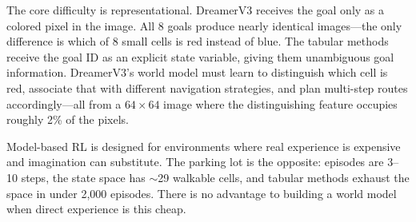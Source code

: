 \documentclass[letterpaper]{article}
\begin{document}
The core difficulty is representational. DreamerV3 receives the goal only as a colored pixel in the image. All 8 goals produce nearly identical images---the only difference is which of 8 small cells is red instead of blue. The tabular methods receive the goal ID as an explicit state variable, giving them unambiguous goal information. DreamerV3's world model must learn to distinguish which cell is red, associate that with different navigation strategies, and plan multi-step routes accordingly---all from a $64 \times 64$ image where the distinguishing feature occupies roughly 2\% of the pixels.

Model-based RL is designed for environments where real experience is expensive and imagination can substitute. The parking lot is the opposite: episodes are 3--10 steps, the state space has $\sim$29 walkable cells, and tabular methods exhaust the space in under 2,000 episodes. There is no advantage to building a world model when direct experience is this cheap.


\end{document}
